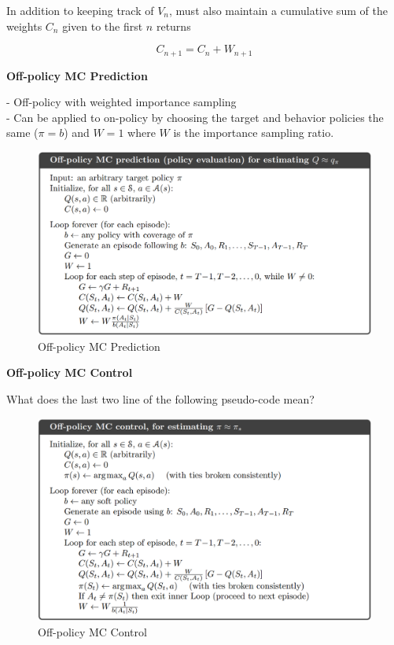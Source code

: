 \documentclass{article}
\begin{document}
\noindent
In addition to keeping track of $V_{n}$, must also maintain a cumulative sum of
the weights $C_{n}$ given to the first $n$ returns

\begin{equation}
C_{n+1}=C_{n}+W_{n+1}
\end{equation}

\newpage
\noindent
\textbf{Off-policy MC Prediction}

\noindent
- Off-policy with weighted importance sampling\\ 
- Can be applied to on-policy by choosing the target and behavior policies the
same ($\pi = b$) and $W = 1$ where $W$ is the importance sampling ratio.

\begin{figure}[h]
\includegraphics[scale=0.25]{offpolicy_mc_prediction}
\centering
\caption{Off-policy MC Prediction}
\end{figure}

\noindent
\textbf{Off-policy MC Control}

\noindent
What does the last two line of the following pseudo-code mean?

\begin{figure}[h]
\includegraphics[scale=0.25]{offpolicy_mc_control}
\centering
\caption{Off-policy MC Control}
\end{figure}
\end{document}
